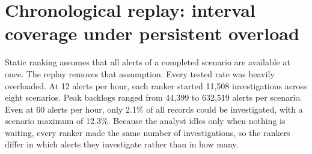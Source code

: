\documentclass[pdflatex,sn-basic,Numbered]{sn-jnl}
\newcommand{\ReplayInvestigations}{11,508}
\newcommand{\ReplaySixtyShare}{2.1}
\newcommand{\ReplaySixtyShareMax}{12.3}
\newcommand{\PeakBacklogMin}{44,399}
\newcommand{\PeakBacklogMax}{632,519}
\begin{document}
\section{Chronological replay: interval coverage under persistent overload}
\label{sec:replay}

Static ranking assumes that all alerts of a completed scenario are available at once. The replay removes that assumption. Every tested rate was heavily overloaded. At 12 alerts per hour, each ranker started \ReplayInvestigations{} investigations across eight scenarios. Peak backlogs ranged from \PeakBacklogMin{} to \PeakBacklogMax{} alerts per scenario. Even at 60 alerts per hour, only \ReplaySixtyShare\% of all records could be investigated, with a scenario maximum of \ReplaySixtyShareMax\%. Because the analyst idles only when nothing is waiting, every ranker made the same number of investigations, so the rankers differ in which alerts they investigate rather than in how many.
\end{document}
